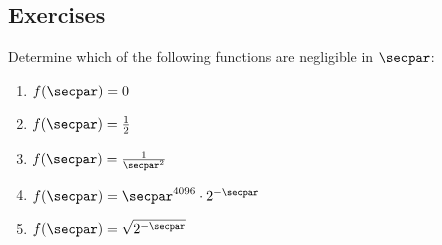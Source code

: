 
\subsection{Exercises}

\begin{exercise}\label{ex:negligible-functions}
  Determine which of the following functions are negligible in $\secpar$:
  \begin{enumerate}
    \item $f(\secpar) = 0$
    \item $f(\secpar) = \frac{1}{2}$
    \item $f(\secpar) = \frac{1}{\secpar^2}$
    \item $f(\secpar) = \secpar^{4096} \cdot 2^{-\secpar}$
    \item $f(\secpar) = \sqrt{2^{-\secpar}}$
  \end{enumerate}
\end{exercise}

